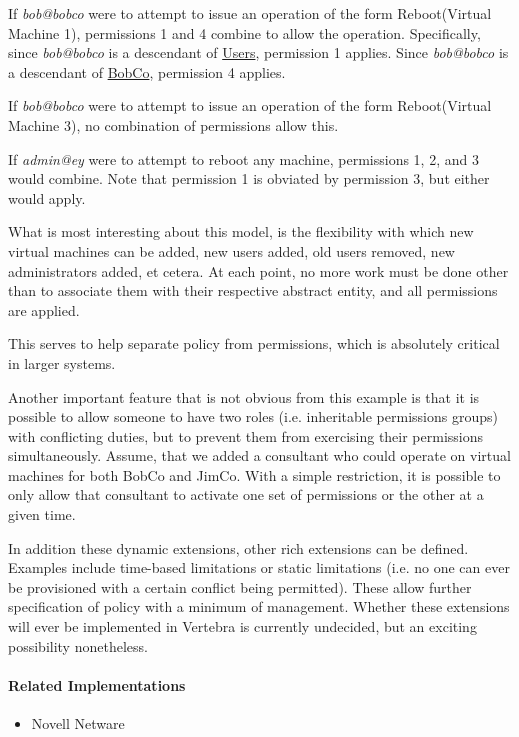 If \emph{bob@bobco} were to attempt to issue an operation of the form \textsf{Reboot(Virtual Machine 1)}, permissions 1 and 4 combine to allow the operation.  Specifically, since \emph{bob@bobco} is a descendant of \underline{Users}, permission 1 applies.  Since \emph{bob@bobco} is a descendant of \underline{BobCo}, permission 4 applies.

If \emph{bob@bobco} were to attempt to issue an operation of the form \textsf{Reboot(Virtual Machine 3)}, no combination of permissions allow this.

If \emph{admin@ey} were to attempt to reboot any machine, permissions 1, 2, and 3 would combine.  Note that permission 1 is obviated by permission 3, but either would apply.

What is most interesting about this model, is the flexibility with which new virtual machines can be added, new users added, old users removed, new administrators added, et cetera.  At each point, no more work must be done other than to associate them with their respective abstract entity, and all permissions are applied.

This serves to help separate policy from permissions, which is absolutely critical in larger systems.

Another important feature that is not obvious from this example is that it is possible to allow someone to have two roles (i.e. inheritable permissions groups) with conflicting duties, but to prevent them from exercising their permissions simultaneously.  Assume, that we added a consultant who could operate on virtual machines for both BobCo and JimCo.  With a simple restriction, it is possible to only allow that consultant to activate one set of permissions or the other at a given time.

In addition these dynamic extensions, other rich extensions can be defined.  Examples include time-based limitations or static limitations (i.e. no one can ever be provisioned with a certain conflict being permitted).  These allow further specification of policy with a minimum of management.  Whether these extensions will ever be implemented in Vertebra is currently undecided, but an exciting possibility nonetheless.

\paragraph{Related Implementations}

\begin{itemize}
	\item Novell Netware\texttrademark{}
\end{itemize}

